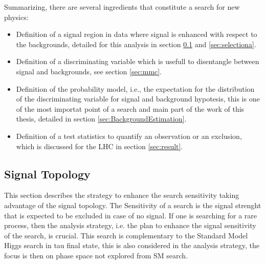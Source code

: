 
Summarizing, there are several ingredients that constitute a search for new physics:
\begin{itemize}
	\item Definition of a signal region in data where signal is enhanced with respect to the backgrounds, detailed for this analysis in section \ref{sec:topology} 
	and \ref{sec:selectiona}.
	\item Definition of a discriminating variable which is usefull to disentangle between signal and backgrounds, see section \ref{sec:mmc}.
	\item Definition of the probability model, i.e., the expectation for the distribution of the discriminating variable
		 for signal and background hypotesis, this is one of the most importat
		point of a search and main part of the work of this thesis, detailed in section \ref{sec:BackgroundEstimation}.
	\item Definition of a test statistics to quantify an observation or an exclusion, which is discussed for the LHC in section \ref{sec:result}.
\end{itemize}



\subsection{Signal Topology}\label{sec:topology}


This section describes the strategy to enhance the search sensitivity 
taking advantage of the signal topology.
The Sensitivity of a search is the signal strenght that is expected to be  excluded 
in case of no signal. If one is searching for a rare process, then the analysis strategy, i.e. the
plan to enhance the signal sensitivity of the search, is crucial.
This search is complementary to the Standard Model
Higgs search in tau final state, this is also considered in the analysis strategy, 
the focus is then on phase space not explored from SM search.

